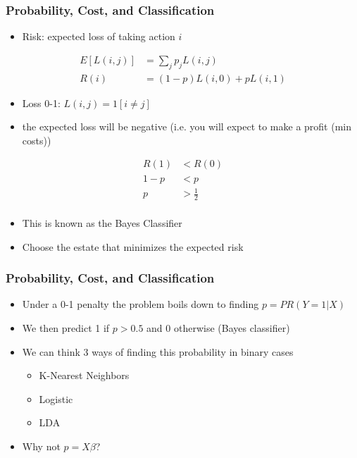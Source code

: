 \documentclass[
  shownotes,
  xcolor={svgnames},
  hyperref={colorlinks,citecolor=DarkBlue,linkcolor=DarkRed,urlcolor=DarkBlue}
  , aspectratio=169]{beamer}
\begin{document}
\begin{frame}[fragile]
\frametitle{Probability, Cost, and Classification}

\begin{itemize}
  \item Risk: expected loss of taking action $i$
\end{itemize}

\begin{align}
E[L(i,j)] &= \sum_j p_j L(i,j) \\ \nonumber
R(i) &= (1-p) L(i,0) + p L(i,1)
\end{align}

\begin{itemize}
  \item Loss 0-1: $L(i,j)=1[i\neq j]$
  \item the expected loss will be negative (i.e. you will expect to make a profit (min costs)) 
\end{itemize}

\begin{align}
R(1) &< R(0) \\ \nonumber
1-p &< p \\ \nonumber
p &> \frac{1}{2} \\ \nonumber
\end{align}

\begin{itemize}
  \item This is known as the Bayes Classifier
  \item Choose the estate that minimizes the expected risk
\end{itemize}

\end{frame}
\begin{frame}[fragile]
\frametitle{Probability, Cost, and Classification}

\begin{itemize}
  \item Under a 0-1 penalty the problem boils down to finding $p=PR(Y=1|X)$
  \medskip
  \item We then predict 1 if $p>0.5$ and 0 otherwise (Bayes classifier)
  \medskip
  \item We can think 3 ways of finding this probability in binary cases
  \begin{itemize}
    \item K-Nearest Neighbors
    \item Logistic
    \item LDA
  \end{itemize}
\medskip
  \item Why not $p=X\beta$?
\end{itemize}


\end{frame}
\end{document}

